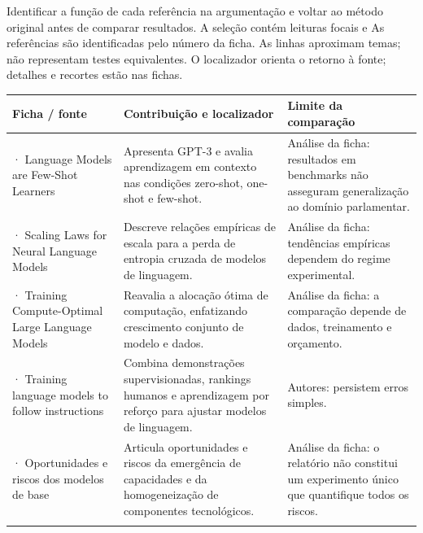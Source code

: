 Identificar a função de cada referência na argumentação e voltar ao método original antes de comparar resultados. A seleção contém leituras focais e
\clearpage
{}
As referências são identificadas pelo número da ficha. As linhas aproximam temas; não representam testes equivalentes. O localizador orienta o retorno à fonte; detalhes e recortes estão nas fichas.

{\small\renewcommand{\arraystretch}{1.3}
\begin{tabularx}{\textwidth}{@{}>{\raggedright\arraybackslash}p{29mm}>{\raggedright\arraybackslash}X>{\raggedright\arraybackslash}X@{}}
\toprule
\textbf{Ficha / fonte} & \textbf{Contribuição e localizador} & \textbf{Limite da comparação}\\
\midrule
32 · Language Models are Few-Shot Learners & Apresenta GPT-3 e avalia aprendizagem em contexto nas condições zero-shot, one-shot e few-shot.\par\smallskip{\footnotesize Resumo} & Análise da ficha: resultados em benchmarks não asseguram generalização ao domínio parlamentar.\\
\addlinespace[5pt]
33 · Scaling Laws for Neural Language Models & Descreve relações empíricas de escala para a perda de entropia cruzada de modelos de linguagem.\par\smallskip{\footnotesize Resumo} & Análise da ficha: tendências empíricas dependem do regime experimental.\\
\addlinespace[5pt]
34 · Training Compute-Optimal Large Language Models & Reavalia a alocação ótima de computação, enfatizando crescimento conjunto de modelo e dados.\par\smallskip{\footnotesize Resumo} & Análise da ficha: a comparação depende de dados, treinamento e orçamento.\\
\addlinespace[5pt]
35 · Training language models to follow instructions & Combina demonstrações supervisionadas, rankings humanos e aprendizagem por reforço para ajustar modelos de linguagem.\par\smallskip{\footnotesize Resumo} & Autores: persistem erros simples.\\
\addlinespace[5pt]
42 · Oportunidades e riscos dos modelos de base & Articula oportunidades e riscos da emergência de capacidades e da homogeneização de componentes tecnológicos.\par\smallskip{\footnotesize Introdução} & Análise da ficha: o relatório não constitui um experimento único que quantifique todos os riscos.\\
\addlinespace[5pt]
\bottomrule
\end{tabularx}}

